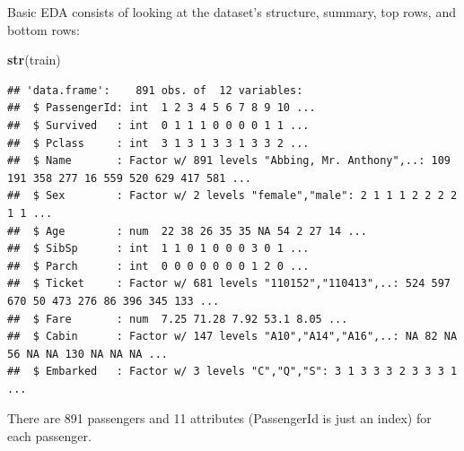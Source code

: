 \documentclass[]{article}
\newenvironment{Shaded}{\begin{snugshade}}{\end{snugshade}}
\newcommand{\KeywordTok}[1]{\textcolor[rgb]{0.13,0.29,0.53}{\textbf{#1}}}
\newcommand{\NormalTok}[1]{#1}
\begin{document}
Basic EDA consists of looking at the dataset's structure, summary, top
rows, and bottom rows:

\begin{Shaded}
\begin{Highlighting}[]
\KeywordTok{str}\NormalTok{(train)}
\end{Highlighting}
\end{Shaded}

\begin{verbatim}
## 'data.frame':    891 obs. of  12 variables:
##  $ PassengerId: int  1 2 3 4 5 6 7 8 9 10 ...
##  $ Survived   : int  0 1 1 1 0 0 0 0 1 1 ...
##  $ Pclass     : int  3 1 3 1 3 3 1 3 3 2 ...
##  $ Name       : Factor w/ 891 levels "Abbing, Mr. Anthony",..: 109 191 358 277 16 559 520 629 417 581 ...
##  $ Sex        : Factor w/ 2 levels "female","male": 2 1 1 1 2 2 2 2 1 1 ...
##  $ Age        : num  22 38 26 35 35 NA 54 2 27 14 ...
##  $ SibSp      : int  1 1 0 1 0 0 0 3 0 1 ...
##  $ Parch      : int  0 0 0 0 0 0 0 1 2 0 ...
##  $ Ticket     : Factor w/ 681 levels "110152","110413",..: 524 597 670 50 473 276 86 396 345 133 ...
##  $ Fare       : num  7.25 71.28 7.92 53.1 8.05 ...
##  $ Cabin      : Factor w/ 147 levels "A10","A14","A16",..: NA 82 NA 56 NA NA 130 NA NA NA ...
##  $ Embarked   : Factor w/ 3 levels "C","Q","S": 3 1 3 3 3 2 3 3 3 1 ...
\end{verbatim}

There are 891 passengers and 11 attributes (PassengerId is just an
index) for each passenger.
\end{document}
